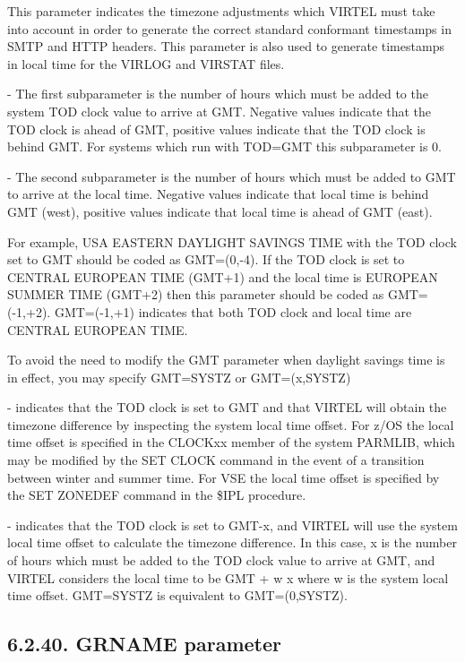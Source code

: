 \documentclass[letterpaper,10pt,english]{sphinxmanual}
\begin{document}
This parameter indicates the timezone adjustments which VIRTEL must take into account in order to generate the correct standard conformant timestamps in SMTP and HTTP headers. This parameter is also used to generate
timestamps in local time for the VIRLOG and VIRSTAT files.

 - The first subparameter is the number of hours which must be added to the system TOD clock value to arrive at GMT. Negative values indicate that the TOD clock is ahead of GMT, positive values indicate that the TOD clock is behind GMT. For systems which run with TOD=GMT this subparameter is 0.

 - The second subparameter is the number of hours which must be added to GMT to arrive at the local time. Negative values indicate that local time is behind GMT (west), positive values indicate that local time is ahead of GMT (east).

For example, USA EASTERN DAYLIGHT SAVINGS TIME with the TOD clock set to GMT should be coded as GMT=(0,-4). If the TOD clock is set to CENTRAL EUROPEAN TIME (GMT+1) and the local time is EUROPEAN SUMMER TIME (GMT+2) then this parameter should be coded as GMT=(-1,+2). GMT=(-1,+1) indicates that both TOD clock and local time are CENTRAL EUROPEAN TIME.

To avoid the need to modify the GMT parameter when daylight savings time is in effect, you may specify GMT=SYSTZ or GMT=(x,SYSTZ)

 - indicates that the TOD clock is set to GMT and that VIRTEL will obtain the timezone difference by inspecting the system local time offset. For z/OS the local time offset is specified in the CLOCKxx member of the system PARMLIB, which may be modified by the SET CLOCK command in the event of a transition between winter and summer time. For VSE the local time offset is specified by the SET ZONEDEF command in the \$IPL procedure.

 - indicates that the TOD clock is set to GMT-x, and VIRTEL will use the system local time offset to calculate the timezone difference. In this case, x is the number of hours which must be added to the TOD clock value to arrive at GMT, and VIRTEL considers the local time to be GMT + w \textendash{} x where w is the system local time offset. GMT=SYSTZ is equivalent to GMT=(0,SYSTZ).


\subsection{6.2.40. GRNAME parameter}
\label{\detokenize{Installation_Guide:grname-parameter}}
\begin{sphinxVerbatim}[commandchars=\\\{\}]
            
\end{sphinxVerbatim}
\end{document}
